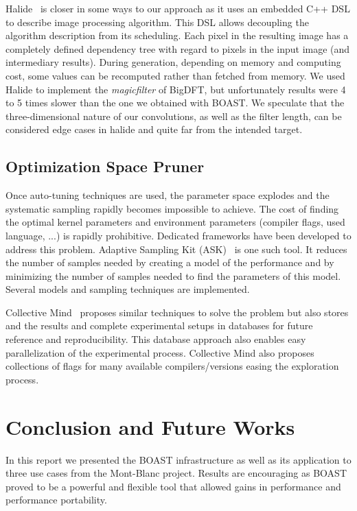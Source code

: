 \documentclass[11pt, a4paper, twoside]{montblanc}
\begin{document}
  Halide~\cite{ragan2013halide} is closer in some ways to our approach as it
uses an embedded C++ DSL to describe image processing algorithm. This DSL allows
decoupling the algorithm description from its scheduling. Each pixel in the
resulting image has a completely defined dependency tree with regard to pixels
in the input image (and intermediary results). During generation, depending on
memory and computing cost, some values can be recomputed rather than fetched from
memory. We used Halide to implement the \emph{magicfilter} of BigDFT, but
unfortunately results were 4 to 5 times slower than the one we obtained with
BOAST. We speculate that the three-dimensional nature of our convolutions, as
well as the filter length, can be considered edge cases in halide and quite far
from the intended target.

  \subsection{Optimization Space Pruner}

  Once auto-tuning techniques are used, the parameter space explodes and the
systematic sampling rapidly becomes impossible to achieve. The cost of finding
the optimal kernel parameters and environment parameters (compiler flags, used
language, ...) is rapidly prohibitive. Dedicated frameworks have been developed
to address this problem. Adaptive Sampling Kit (ASK)~\cite{castro2013adaptive}
is one such tool. It reduces the number of samples needed by creating a model of
the performance and by minimizing the number of samples needed to find the
parameters of this model. Several models and sampling techniques are
implemented.

  Collective Mind~\cite{fursin:hal-01054763} proposes similar techniques to
solve the problem but also stores and the results and complete experimental
setups in databases for future reference and reproducibility. This database
approach also enables easy parallelization of the experimental process.
Collective Mind also proposes collections of flags for many available
compilers/versions easing the exploration process.

\section{Conclusion and Future Works}

In this report we presented the BOAST infrastructure as well as its
application to three use cases from the Mont-Blanc project. Results are
encouraging as BOAST proved to be a powerful and flexible tool that allowed
gains in performance and performance portability.
\end{document}
